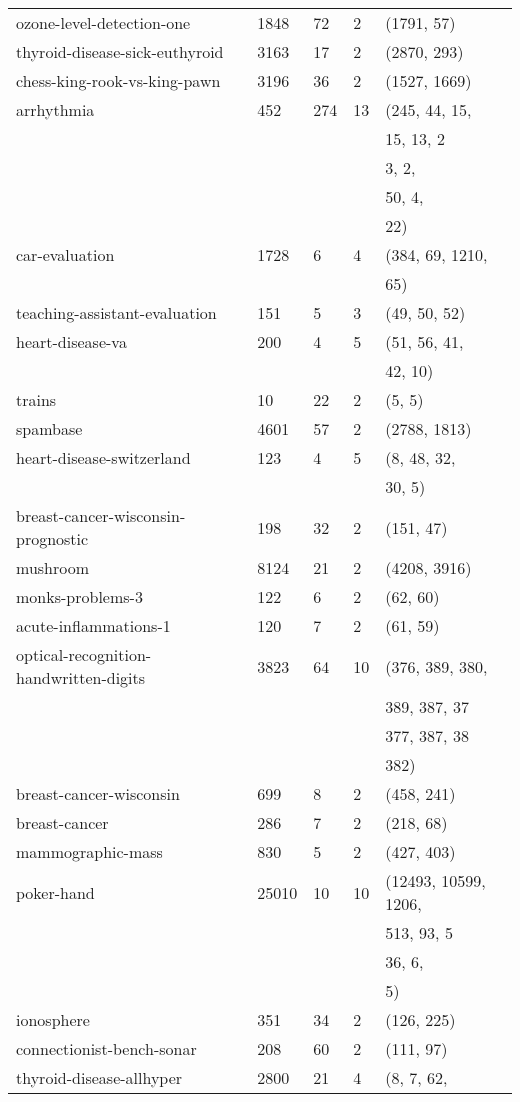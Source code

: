 \documentclass{article}%
\begin{document}
\begin{longtable}{l l l l l}
ozone{-}level{-}detection{-}one&1848&72&2&(1791, 57)\\%
thyroid{-}disease{-}sick{-}euthyroid&3163&17&2&(2870, 293)\\%
chess{-}king{-}rook{-}vs{-}king{-}pawn&3196&36&2&(1527, 1669)\\%
arrhythmia&452&274&13&(245, 44, 15,\\%
&&&&15, 13, 2\\%
&&&&3, 2, \\%
&&&&50, 4, \\%
&&&&22)\\%
car{-}evaluation&1728&6&4&(384, 69, 1210,\\%
&&&&65)\\%
teaching{-}assistant{-}evaluation&151&5&3&(49, 50, 52)\\%
heart{-}disease{-}va&200&4&5&(51, 56, 41,\\%
&&&&42, 10)\\%
trains&10&22&2&(5, 5)\\%
spambase&4601&57&2&(2788, 1813)\\%
heart{-}disease{-}switzerland&123&4&5&(8, 48, 32,\\%
&&&&30, 5)\\%
breast{-}cancer{-}wisconsin{-}prognostic&198&32&2&(151, 47)\\%
mushroom&8124&21&2&(4208, 3916)\\%
monks{-}problems{-}3&122&6&2&(62, 60)\\%
acute{-}inflammations{-}1&120&7&2&(61, 59)\\%
optical{-}recognition{-}handwritten{-}digits&3823&64&10&(376, 389, 380,\\%
&&&&389, 387, 37\\%
&&&&377, 387, 38\\%
&&&&382)\\%
breast{-}cancer{-}wisconsin&699&8&2&(458, 241)\\%
breast{-}cancer&286&7&2&(218, 68)\\%
mammographic{-}mass&830&5&2&(427, 403)\\%
poker{-}hand&25010&10&10&(12493, 10599, 1206,\\%
&&&&513, 93, 5\\%
&&&&36, 6, \\%
&&&&5)\\%
ionosphere&351&34&2&(126, 225)\\%
connectionist{-}bench{-}sonar&208&60&2&(111, 97)\\%
thyroid{-}disease{-}allhyper&2800&21&4&(8, 7, 62,\\%

\end{longtable}
\end{document}
